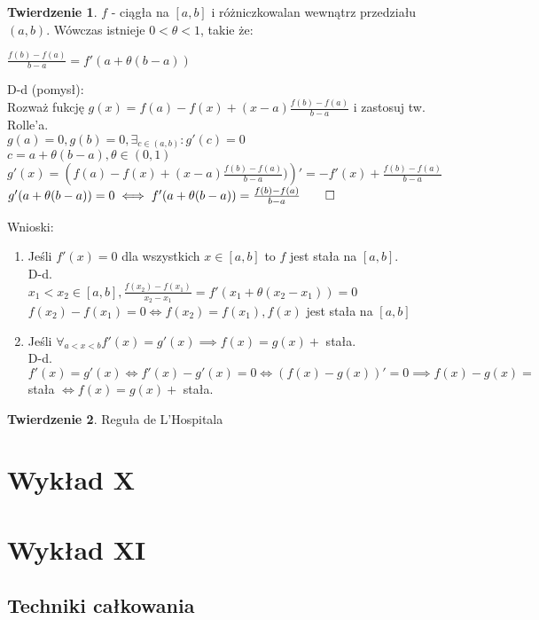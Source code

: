 \documentclass{article}
\theoremstyle{definition}
\theoremstyle{definition}
\newtheorem{tw}{Twierdzenie}[subsection]
\theoremstyle{definition}
\theoremstyle{definition}
\begin{document}
    \begin{tw}
        $f$ - ciągła na $[a,b]$ i różniczkowalan wewnątrz przedziału $(a,b)$. Wówczas istnieje $0<\theta<1$, takie że:
        \begin{center}
            $\frac{f(b)-f(a)}{b-a} = f'(a+\theta(b-a))$
        \end{center}
        D-d (pomysł):\\
        Rozważ fukcję $g(x)=f(a)-f(x)+(x-a)\frac{f(b)-f(a)}{b-a}$ i zastosuj tw. Rolle'a.\\
        $g(a)=0, g(b)=0, \exists_{c\in(a,b)} : g'(c)=0$\\
        $c=a+\theta(b-a), \theta\in(0,1)$\\
        $g'(x)=\left(f(a)-f(x)+(x-a)\frac{f(b)-f(a)}{b-a})\right)'=-f'(x)+\frac{f(b)-f(a)}{b-a}$\\
        $g'(a+\theta(b-a))=0 \iff f'(a+\theta(b-a)) = \frac{f(b)-f(a)}{b-a}\qed$
    \end{tw}
    Wnioski:
    \begin{enumerate}
        \item Jeśli $f'(x)=0$ dla wszystkich $x\in[a,b]$ to $f$ jest stała na $[a,b]$.\\
        D-d.\\
        $x_1<x_2\in[a,b], \frac{f(x_2)-f(x_1)}{x_2-x_1} = f'(x_1+\theta(x_2-x_1))=0$\\
        $f(x_2)-f(x_1) = 0 \iff f(x_2) = f(x_1), f(x)$ jest stała na $[a,b]$
        \item Jeśli $\forall_{a<x<b} f'(x)=g'(x) \implies f(x)=g(x) + $ stała.\\
        D-d.\\
        $f'(x)=g'(x)\iff f'(x)-g'(x)=0 \iff (f(x)-g(x))'=0 \implies f(x)-g(x) =$ stała $\iff f(x)=g(x) + $ stała.
    \end{enumerate}
    
    \begin{tw}
        Reguła de L'Hospitala
    \end{tw}

\section{Wykład X}

\section{Wykład XI}

\subsection{Techniki całkowania}
\end{document}
